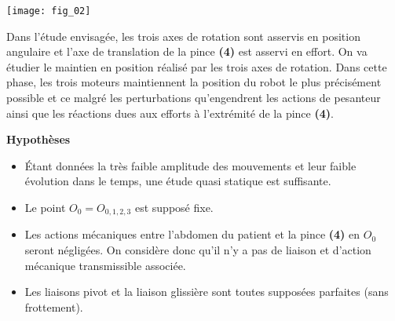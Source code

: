 \begin{center}
\texttt{[image: fig\_02]}
\end{center}

Dans l’étude envisagée, les trois axes de rotation sont asservis en position angulaire et l’axe de translation de la pince \textbf{(4)} est asservi en effort. On va étudier le maintien en position réalisé par les trois axes de rotation. Dans cette phase, les trois moteurs maintiennent la position du robot le plus précisément possible et ce malgré les perturbations qu’engendrent les actions de pesanteur ainsi que les réactions dues aux efforts à l’extrémité de la pince \textbf{(4)}.

\noindent\textbf{Hypothèses}
\begin{itemize}
\item Étant données la très faible amplitude des mouvements et leur faible évolution dans le temps, une étude quasi statique est suffisante.
\item Le point $O_0 = O_{0,1,2,3}$ est supposé fixe.
\item Les actions mécaniques entre l’abdomen du patient et la pince \textbf{(4)} en $O_0$ seront négligées. On considère donc qu’il n’y a pas de liaison et d’action mécanique transmissible associée.
\item Les liaisons pivot et la liaison glissière sont toutes supposées parfaites (sans frottement).
\end{itemize}

